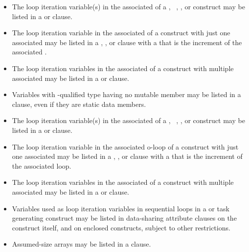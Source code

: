 \begin{ccppspecific}
\begin{itemize}
\item The loop iteration variable(s) in the associated  of a ,
~, , or  construct may be listed in a  or  clause.

\item The loop iteration variable in the associated  of a  construct with just
one associated  may be listed in a ,
, or  clause with a
that is the increment of the associated .

\item The loop iteration variables in the associated  of a  construct with
multiple associated  may be listed in a  or  clause.

\item Variables with -qualified type having no mutable member may be listed in a
 clause, even if they are static data members.
\end{itemize}
\end{ccppspecific}
%
\begin{fortranspecific}
\begin{itemize}
\item The loop iteration variable(s) in the associated  of a ,
~, , or 
construct may be listed in a  or  clause.

\item The loop iteration variable in the associated o-loop of a  construct with just
one associated  may be listed in a ,
, or  clause with a 
that is the increment of the associated loop.

\item The loop iteration variables in the associated  of a  construct with
multiple associated  may be listed in a  or  clause.

\item Variables used as loop iteration variables in sequential loops in a 
or task generating construct may be listed in data-sharing attribute clauses on the construct itself, and on
enclosed constructs, subject to other restrictions.

\item Assumed-size arrays may be listed in a  clause.
\end{itemize}
\end{fortranspecific}


